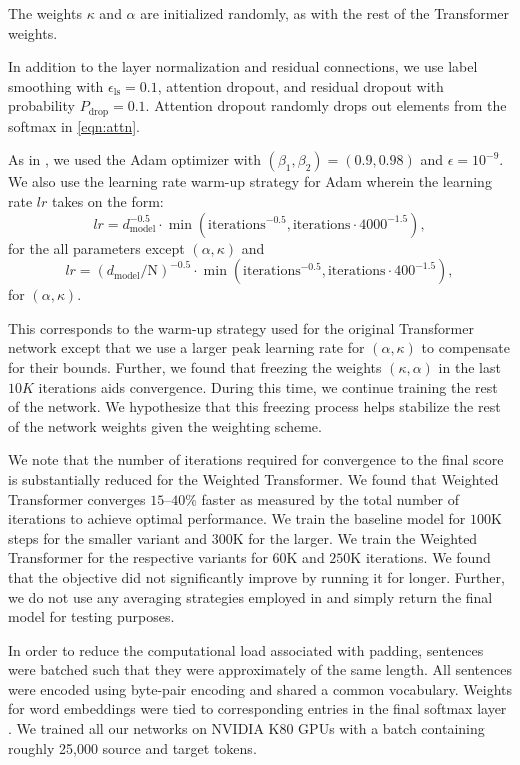 \documentclass{article} %
\newcommand{\name}{Weighted Transformer\xspace}
\begin{document}
The weights $\kappa$ and $\alpha$ are initialized randomly, as with the rest of the Transformer weights. 

In addition to the layer normalization and residual connections, we use label smoothing with $\epsilon_{\text{ls}}=0.1$, attention dropout, and residual dropout with probability $P_{\text{drop}}=0.1$. Attention dropout randomly drops out elements \citep{srivastava2014dropout} from the softmax in \eqref{eqn:attn}.

As in \citet{vaswani2017attention}, we used the Adam optimizer \citep{kingma2014adam} with $(\beta_1,\beta_2)=(0.9,0.98)$ and $\epsilon=10^{-9}$. We also use the learning rate warm-up strategy for Adam wherein the learning rate $lr$ takes on the form:
$$ lr = d_{\text{model}}^{-0.5} \cdot \min(\text{iterations}^{-0.5}, \text{iterations} \cdot 4000^{-1.5}),$$
for the all parameters except $(\alpha,\kappa)$ and 
$$ lr = {(d_{\text{model}}/\text{N})}^{-0.5} \cdot \min(\text{iterations}^{-0.5}, \text{iterations} \cdot 400^{-1.5}),$$
for $(\alpha,\kappa)$. 

This corresponds to the warm-up strategy used for the original Transformer network except that we use a larger peak learning rate for $(\alpha,\kappa)$ to compensate for their bounds. Further, we found that freezing the weights $(\kappa,\alpha)$ in the last $10K$ iterations aids convergence. During this time, we continue training the rest of the network. We hypothesize that this freezing process helps stabilize the rest of the network weights given the weighting scheme. 

We note that the number of iterations required for convergence to the final score is substantially reduced for the \name. We found that \name converges $15$--$40\%$ faster as measured by the total number of iterations to achieve optimal performance. We train the baseline model for $100$K steps for the smaller variant and $300$K for the larger. We train the \name for the respective variants for $60$K and $250$K iterations. We found that the objective did not significantly improve by running it for longer. Further, we do not use any averaging strategies employed in \citet{vaswani2017attention} and simply return the final model for testing purposes. 

In order to reduce the computational load associated with padding, sentences were batched such that they were approximately of the same length. All sentences were encoded using byte-pair encoding \citep{sennrich2015neural} and shared a common vocabulary. Weights for word embeddings were tied to corresponding entries in the final softmax layer \citep{inan2016tying,press2016using}. We trained all our networks on NVIDIA K80 GPUs with a batch containing roughly 25,000 source and target tokens. 
\end{document}
